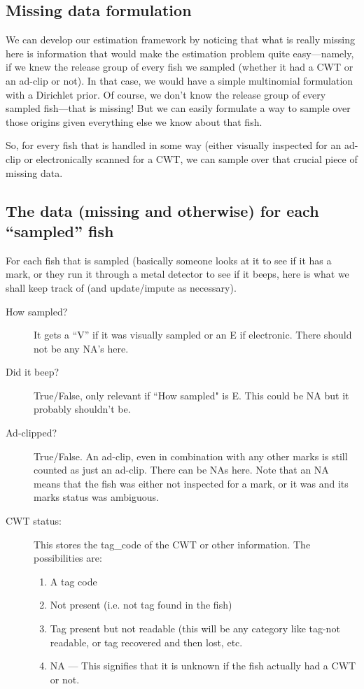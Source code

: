\documentclass[11pt]{article}
\begin{document}
\subsection{Missing data formulation}
We can develop our estimation framework by noticing that what is really missing here is information
that would make the estimation problem quite easy---namely, if we knew the release group of every
fish we sampled (whether it had a CWT or an ad-clip or not).  In that case, we would have a simple multinomial
formulation with a Dirichlet prior.  Of course, we don't know the release group of every sampled
fish---that is missing!  But we can easily formulate a way to sample over those origins given
everything else we know about that fish.  

So, for every fish that is handled in some way (either visually inspected for an ad-clip or
electronically scanned for a CWT, we can sample over that crucial piece of missing data.  

\subsection{The data (missing and otherwise) for each ``sampled'' fish}

For each fish that is sampled (basically someone looks at it to see if it has a mark, or they
run it through a metal detector to see if it beeps, here is what we shall keep track of (and
update/impute as necessary).

\begin{description}
	\item [How sampled?]  It gets a ``V'' if it was visually sampled or an E if electronic.  There should
	not be any NA's here.
	\item [Did it beep?] True/False, only relevant if ``How sampled" is E.  This could be NA but it probably
	shouldn't be.
	\item [Ad-clipped?]  True/False.  An ad-clip, even in combination with any other marks is still counted
	as just an ad-clip.  There can be NAs here. Note that an NA means that the fish was either not
	inspected for a mark, or it was and its marks status was ambiguous.
	\item [CWT status:] This stores the tag\_code of the CWT or other information.  The possibilities are:
	\begin{enumerate}
		\item A tag code
		\item Not present (i.e. not tag found in the fish)
		\item Tag present but not readable (this will be any category like tag-not readable, or tag
		recovered and then lost, etc.
		\item NA --- This signifies that it is unknown if the fish actually had a CWT or not.
	\end{enumerate}

\end{description}
\end{document}
